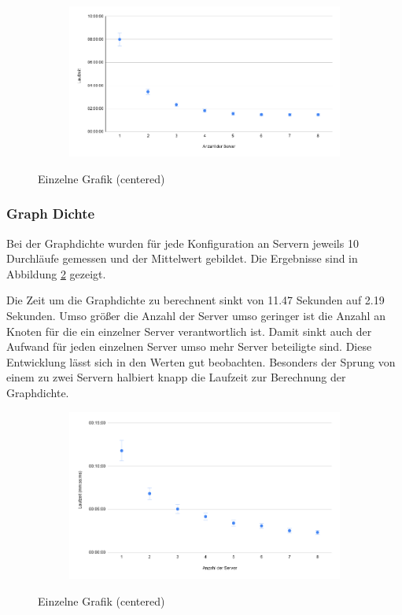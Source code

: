 \begin{figure}
  \centering
  \begin{subfigure}[b]{1.0\textwidth}
    \includegraphics[width=1.0\linewidth]{img/eval_load.png}
  \end{subfigure}
  \caption{Einzelne Grafik (centered)}
  \label{eval:load}
\end{figure}

\subsubsection{Graph Dichte}

Bei der Graphdichte wurden für jede Konfiguration an Servern jeweils 10 Durchläufe gemessen und der Mittelwert gebildet. Die Ergebnisse sind in Abbildung \ref{eval:density} gezeigt.

Die Zeit um die Graphdichte zu berechnent sinkt von 11.47 Sekunden auf 2.19 Sekunden. Umso größer die Anzahl der Server umso geringer ist die Anzahl an Knoten für die ein einzelner Server verantwortlich ist. Damit sinkt auch der Aufwand für jeden einzelnen Server umso mehr Server beteiligte sind. 
Diese Entwicklung lässt sich in den Werten gut beobachten. Besonders der Sprung von einem zu zwei Servern halbiert knapp die Laufzeit zur Berechnung der Graphdichte.

\begin{figure}
  \centering
  \begin{subfigure}[b]{1.0\textwidth}
    \includegraphics[width=1.0\linewidth]{img/eval_density.png}
  \end{subfigure}
  \caption{Einzelne Grafik (centered)}
  \label{eval:density}
\end{figure}



